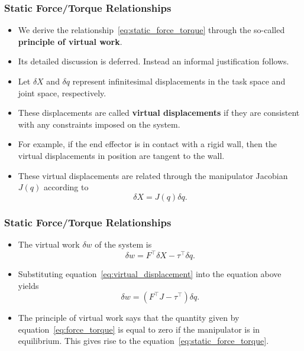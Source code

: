 \begin{frame}
    \frametitle{Static Force/Torque Relationships}

    \begin{itemize}
        \item We derive the relationship~\eqref{eq:static_force_torque} through 
        the so-called \textbf{principle of virtual work}.
        \item Its detailed discussion is deferred. Instead an informal
        justification follows.
        \item Let $\delta X$ and $\delta q$ represent infinitesimal
        displacements in the task space and joint space, respectively.
        \item These displacements are called \textbf{virtual displacements} if 
        they are consistent with any constraints imposed on the system.
        \item For example, if the end effector is in contact with a rigid wall, 
        then the virtual displacements in position are tangent to the wall.
        \item These virtual displacements are related through the manipulator 
        Jacobian $J(q)$ according to 
        \begin{equation}
            \delta X = J(q) \delta q.
            \label{eq:virtual_displacement}
        \end{equation}
    \end{itemize}
\end{frame}


\begin{frame}
    \frametitle{Static Force/Torque Relationships}

    \begin{itemize}
        \item The virtual work $\delta w$ of the system is 
        \[ \delta w = F^\top \delta X - \tau^\top \delta q. \]
        \item Substituting equation~\eqref{eq:virtual_displacement} into the
        equation above yields
        \begin{equation}
            \delta w = \left( F^\top J - \tau^\top \right) \delta q.
            \label{eq:force_torque}
        \end{equation} 
        \item The principle of virtual work says that the quantity given by
        equation~\eqref{eq:force_torque} is equal to zero if the manipulator is
        in equilibrium. This gives rise to the
        equation~\eqref{eq:static_force_torque}.
    \end{itemize}
\end{frame}



